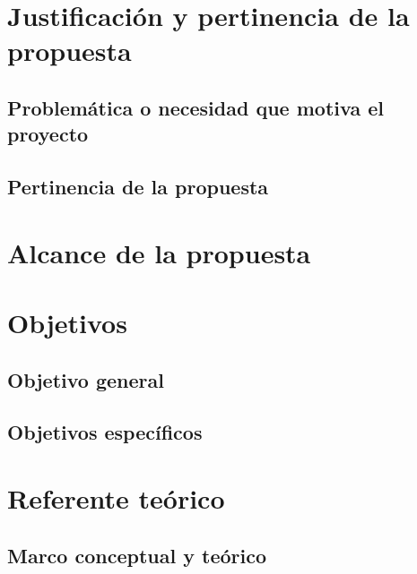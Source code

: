 \documentclass[11pt,a4paper]{article}
\title{}
\author{Equipo de Investigación}
\date{\today}
\begin{document}
\maketitle

\section{Justificación y pertinencia de la propuesta}
\label{sec:justificacion}

\subsection{Problemática o necesidad que motiva el proyecto}
\label{sec:problematica}




\subsection{Pertinencia de la propuesta}
\label{subsec:pertinencia}


\section{Alcance de la propuesta}
\label{sec:alcance}


\section{Objetivos}
\label{sec:objetivos}
\subsection{Objetivo general}
\label{subsec:objetivo_general}

\subsection{Objetivos específicos}
\label{subsec:objetivos_especificos}


\section{Referente teórico}
\label{sec:referente}
\subsection{Marco conceptual y teórico}
\label{subsec:marco}

\end{document}
